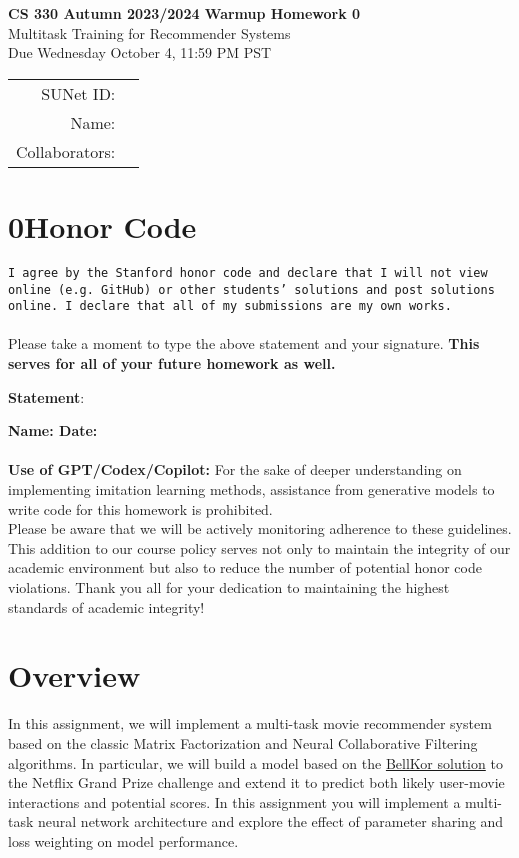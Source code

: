 \documentclass[12pt]{article}
\begin{document}
\begin{center}
{\Large \textbf{CS 330 Autumn 2023/2024 Warmup Homework 0} \\ Multitask Training for Recommender Systems
\\ Due Wednesday October 4, 11:59 PM PST}
\vspace{0.2cm}

\begin{tabular}{rl}
SUNet ID: &  \\
Name: & \\
Collaborators: & 
\end{tabular}
\end{center}
 
\section*{0\hspace{15pt}Honor Code}
\texttt{I agree by the Stanford honor code and declare that I will not view online (e.g. GitHub) or other students' solutions and post solutions online. I declare that all of my submissions are my own works.}
\\ \\
\noindent Please take a moment to type the above statement and your signature. \textbf{This serves for all of your future homework as well.}

\noindent \textbf{Statement}:

\noindent \textbf{Name:          Date:}
\\ \\
\noindent\textbf{Use of GPT/Codex/Copilot:} For the sake of deeper understanding on implementing imitation learning methods, assistance from generative models to write code for this homework is prohibited. 
\\
\noindent Please be aware that we will be actively monitoring adherence to these guidelines. This addition to our course policy serves not only to maintain the integrity of our academic environment but also to reduce the number of potential honor code violations. Thank you all for your dedication to maintaining the highest standards of academic integrity!

\section{Overview}
In this assignment, we will implement a multi-task movie recommender system based on the classic Matrix Factorization \cite{Yehuda2009matrix} and Neural Collaborative Filtering ~\cite{he2017neural} algorithms. In particular, we will build a model based on the \href{https://www2.seas.gwu.edu/~simhaweb/champalg/cf/papers/KorenBellKor2009.pdf}{BellKor solution} to the Netflix Grand Prize challenge and extend it to predict both likely user-movie interactions and potential scores. In this assignment you will implement a multi-task neural network architecture and explore the effect of parameter sharing and loss weighting on model performance.
\end{document}
